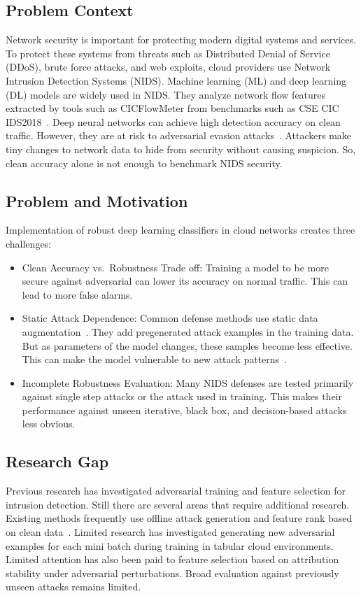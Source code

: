 \documentclass[conference]{IEEEtran}
\begin{document}
\subsection{Problem Context}
Network security is important for protecting modern digital systems and services. To protect these systems from threats such as Distributed Denial of Service (DDoS), brute force attacks, and web exploits, cloud providers use Network Intrusion Detection Systems (NIDS). Machine learning (ML) and deep learning (DL) models are widely used in NIDS. They analyze network flow features extracted by tools such as CICFlowMeter from benchmarks such as CSE CIC IDS2018~\cite{ref1,ref2}. Deep neural networks can achieve high detection accuracy on clean traffic. However, they are at risk to adversarial evasion attacks~\cite{ref3}. Attackers make tiny changes to network data to hide from security without causing suspicion. So, clean accuracy alone is not enough to benchmark NIDS security.

\subsection{Problem and Motivation}
Implementation of robust deep learning classifiers in cloud networks creates three challenges:
\begin{itemize}
    \item Clean Accuracy vs.\ Robustness Trade off: Training a model to be more secure against adversarial can lower its accuracy on normal traffic. This can lead to more false alarms.
    \item Static Attack Dependence: Common defense methods use static data augmentation~\cite{ref4}. They add pregenerated attack examples in the training data. But as parameters of the model changes, these samples become less effective. This can make the model vulnerable to new attack patterns~\cite{ref5}.
    \item Incomplete Robustness Evaluation: Many NIDS defenses are tested primarily against single step attacks or the attack used in training. This makes their performance against unseen iterative, black box, and decision-based attacks less obvious.
\end{itemize}

\subsection{Research Gap}
Previous research has investigated adversarial training and feature selection for intrusion detection. Still there are several areas that require additional research. Existing methods frequently use offline attack generation and feature rank based on clean data~\cite{ref6}. Limited research has investigated generating new adversarial examples for each mini batch during training in tabular cloud environments. Limited attention has also been paid to feature selection based on attribution stability under adversarial perturbations. Broad evaluation against previously unseen attacks remains limited.
\end{document}
